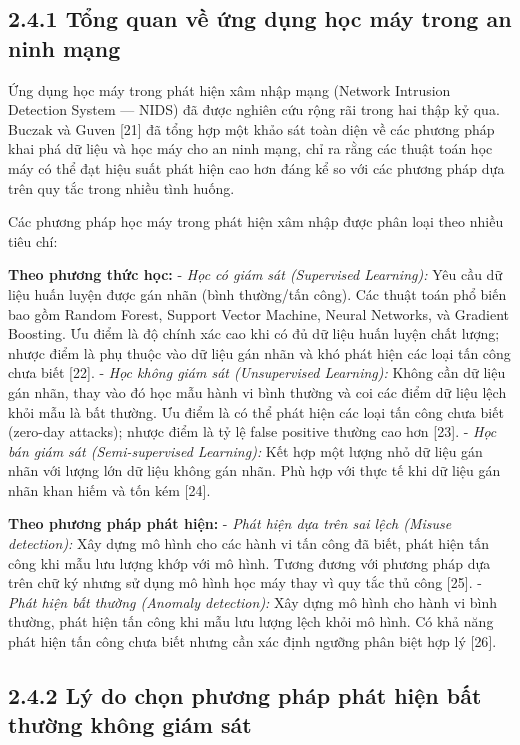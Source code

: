 \documentclass[
  a4paper]{report}
\begin{document}
\subsection{2.4.1 Tổng quan về ứng dụng học máy trong an ninh
mạng}\label{tux1ed5ng-quan-vux1ec1-ux1ee9ng-dux1ee5ng-hux1ecdc-muxe1y-trong-an-ninh-mux1ea1ng}

Ứng dụng học máy trong phát hiện xâm nhập mạng (Network Intrusion
Detection System --- NIDS) đã được nghiên cứu rộng rãi trong hai thập kỷ
qua. Buczak và Guven {[}21{]} đã tổng hợp một khảo sát toàn diện về các
phương pháp khai phá dữ liệu và học máy cho an ninh mạng, chỉ ra rằng
các thuật toán học máy có thể đạt hiệu suất phát hiện cao hơn đáng kể so
với các phương pháp dựa trên quy tắc trong nhiều tình huống.

Các phương pháp học máy trong phát hiện xâm nhập được phân loại theo
nhiều tiêu chí:

\textbf{Theo phương thức học:} - \emph{Học có giám sát (Supervised
Learning):} Yêu cầu dữ liệu huấn luyện được gán nhãn (bình thường/tấn
công). Các thuật toán phổ biến bao gồm Random Forest, Support Vector
Machine, Neural Networks, và Gradient Boosting. Ưu điểm là độ chính xác
cao khi có đủ dữ liệu huấn luyện chất lượng; nhược điểm là phụ thuộc vào
dữ liệu gán nhãn và khó phát hiện các loại tấn công chưa biết {[}22{]}.
- \emph{Học không giám sát (Unsupervised Learning):} Không cần dữ liệu
gán nhãn, thay vào đó học mẫu hành vi bình thường và coi các điểm dữ
liệu lệch khỏi mẫu là bất thường. Ưu điểm là có thể phát hiện các loại
tấn công chưa biết (zero-day attacks); nhược điểm là tỷ lệ false
positive thường cao hơn {[}23{]}. - \emph{Học bán giám sát
(Semi-supervised Learning):} Kết hợp một lượng nhỏ dữ liệu gán nhãn với
lượng lớn dữ liệu không gán nhãn. Phù hợp với thực tế khi dữ liệu gán
nhãn khan hiếm và tốn kém {[}24{]}.

\textbf{Theo phương pháp phát hiện:} - \emph{Phát hiện dựa trên sai lệch
(Misuse detection):} Xây dựng mô hình cho các hành vi tấn công đã biết,
phát hiện tấn công khi mẫu lưu lượng khớp với mô hình. Tương đương với
phương pháp dựa trên chữ ký nhưng sử dụng mô hình học máy thay vì quy
tắc thủ công {[}25{]}. - \emph{Phát hiện bất thường (Anomaly
detection):} Xây dựng mô hình cho hành vi bình thường, phát hiện tấn
công khi mẫu lưu lượng lệch khỏi mô hình. Có khả năng phát hiện tấn công
chưa biết nhưng cần xác định ngưỡng phân biệt hợp lý {[}26{]}.

\subsection{2.4.2 Lý do chọn phương pháp phát hiện bất thường không giám
sát}\label{luxfd-do-chux1ecdn-phux1b0ux1a1ng-phuxe1p-phuxe1t-hiux1ec7n-bux1ea5t-thux1b0ux1eddng-khuxf4ng-giuxe1m-suxe1t}
\end{document}
